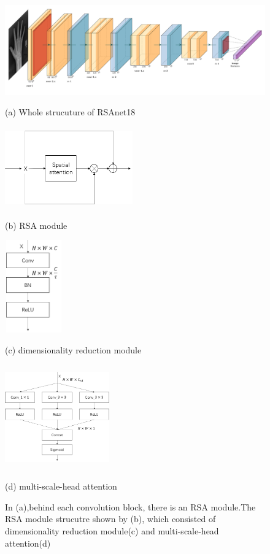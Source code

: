 \documentclass{article}
\begin{document}
\begin{figure}[t]

\begin{minipage}[b]{1.0\linewidth}
  \centering
  \centerline{\includegraphics[width=12cm]{RS_Resnet18.pdf}}
  \centerline{(a) Whole strucuture of RSAnet18}\medskip
\end{minipage}
%
\begin{minipage}[b]{.32\linewidth}
  \centering
  \centerline{\includegraphics[width=5.5cm, height=3.5cm]{r_attention.png}}
  \centerline{(b) RSA module}\medskip
\end{minipage}
\begin{minipage}[b]{.32\linewidth}
  \centering
  \centerline{\includegraphics[width=2.5cm,  height=4.0cm]{rd.png}}
  \centerline{(c)  dimensionality reduction module}\medskip
\end{minipage}
\begin{minipage}[b]{0.32\linewidth}
  \centering
  \centerline{\includegraphics[width=4.5cm,  height=4.5cm]{attention.png}}
  \centerline{(d) multi-scale-head attention}\medskip
\end{minipage}
%
\caption{In (a),behind each convolution block, there is an RSA module.The RSA module strucutre shown by (b), which consisted of dimensionality reduction module(c) and multi-scale-head attention(d)}
\label{fig:res}
%
\end{figure} 
\end{document}
